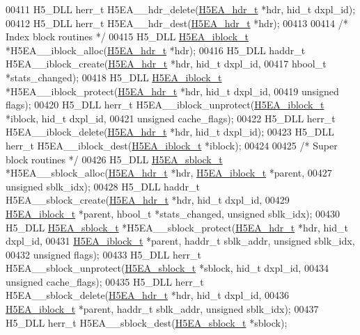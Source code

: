 \begin{DoxyCode}
00411 H5\_DLL herr\_t H5EA\_\_hdr\_delete(\hyperlink{struct_h5_e_a__hdr__t}{H5EA\_hdr\_t} *hdr, hid\_t dxpl\_id);
00412 H5\_DLL herr\_t H5EA\_\_hdr\_dest(\hyperlink{struct_h5_e_a__hdr__t}{H5EA\_hdr\_t} *hdr);
00413 
00414 \textcolor{comment}{/* Index block routines */}
00415 H5\_DLL \hyperlink{struct_h5_e_a__iblock__t}{H5EA\_iblock\_t} *H5EA\_\_iblock\_alloc(\hyperlink{struct_h5_e_a__hdr__t}{H5EA\_hdr\_t} *hdr);
00416 H5\_DLL haddr\_t H5EA\_\_iblock\_create(\hyperlink{struct_h5_e_a__hdr__t}{H5EA\_hdr\_t} *hdr, hid\_t dxpl\_id,
00417     hbool\_t *stats\_changed);
00418 H5\_DLL \hyperlink{struct_h5_e_a__iblock__t}{H5EA\_iblock\_t} *H5EA\_\_iblock\_protect(\hyperlink{struct_h5_e_a__hdr__t}{H5EA\_hdr\_t} *hdr, hid\_t dxpl\_id,
00419     \textcolor{keywordtype}{unsigned} flags);
00420 H5\_DLL herr\_t H5EA\_\_iblock\_unprotect(\hyperlink{struct_h5_e_a__iblock__t}{H5EA\_iblock\_t} *iblock, hid\_t dxpl\_id,
00421     \textcolor{keywordtype}{unsigned} cache\_flags);
00422 H5\_DLL herr\_t H5EA\_\_iblock\_delete(\hyperlink{struct_h5_e_a__hdr__t}{H5EA\_hdr\_t} *hdr, hid\_t dxpl\_id);
00423 H5\_DLL herr\_t H5EA\_\_iblock\_dest(\hyperlink{struct_h5_e_a__iblock__t}{H5EA\_iblock\_t} *iblock);
00424 
00425 \textcolor{comment}{/* Super block routines */}
00426 H5\_DLL \hyperlink{struct_h5_e_a__sblock__t}{H5EA\_sblock\_t} *H5EA\_\_sblock\_alloc(\hyperlink{struct_h5_e_a__hdr__t}{H5EA\_hdr\_t} *hdr, 
      \hyperlink{struct_h5_e_a__iblock__t}{H5EA\_iblock\_t} *parent,
00427     \textcolor{keywordtype}{unsigned} sblk\_idx);
00428 H5\_DLL haddr\_t H5EA\_\_sblock\_create(\hyperlink{struct_h5_e_a__hdr__t}{H5EA\_hdr\_t} *hdr, hid\_t dxpl\_id,
00429     \hyperlink{struct_h5_e_a__iblock__t}{H5EA\_iblock\_t} *parent, hbool\_t *stats\_changed, \textcolor{keywordtype}{unsigned} sblk\_idx);
00430 H5\_DLL \hyperlink{struct_h5_e_a__sblock__t}{H5EA\_sblock\_t} *H5EA\_\_sblock\_protect(\hyperlink{struct_h5_e_a__hdr__t}{H5EA\_hdr\_t} *hdr, hid\_t dxpl\_id,
00431     \hyperlink{struct_h5_e_a__iblock__t}{H5EA\_iblock\_t} *parent, haddr\_t sblk\_addr, \textcolor{keywordtype}{unsigned} sblk\_idx, 
00432     \textcolor{keywordtype}{unsigned} flags);
00433 H5\_DLL herr\_t H5EA\_\_sblock\_unprotect(\hyperlink{struct_h5_e_a__sblock__t}{H5EA\_sblock\_t} *sblock, hid\_t dxpl\_id,
00434     \textcolor{keywordtype}{unsigned} cache\_flags);
00435 H5\_DLL herr\_t H5EA\_\_sblock\_delete(\hyperlink{struct_h5_e_a__hdr__t}{H5EA\_hdr\_t} *hdr, hid\_t dxpl\_id,
00436     \hyperlink{struct_h5_e_a__iblock__t}{H5EA\_iblock\_t} *parent, haddr\_t sblk\_addr, \textcolor{keywordtype}{unsigned} sblk\_idx);
00437 H5\_DLL herr\_t H5EA\_\_sblock\_dest(\hyperlink{struct_h5_e_a__sblock__t}{H5EA\_sblock\_t} *sblock);

\end{DoxyCode}
